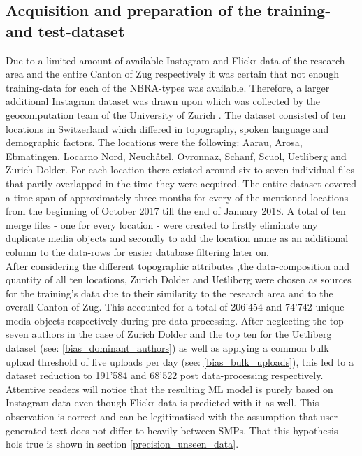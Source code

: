 \subsection{Acquisition and preparation of the training- and test-dataset} \label{preparation_training_data}
Due to a limited amount of available Instagram and Flickr data of the research area and the entire Canton of Zug respectively it was certain that not enough training-data for each of the NBRA-types was available. Therefore, a larger additional Instagram dataset was drawn upon which was collected by the geocomputation team of the University of Zurich \parencite{Gruzd2016}. The dataset consisted of ten locations in Switzerland which differed in topography, spoken language and demographic factors. The locations were the following: Aarau, Arosa, Ebmatingen, Locarno Nord, Neuch\^{a}tel, Ovronnaz, Schanf, Scuol, Uetliberg and Zurich Dolder. For each location there existed around six to seven individual files that partly overlapped in the time they were acquired. The entire dataset covered a time-span of approximately three months for every of the mentioned locations from the beginning of October 2017 till the end of January 2018. A total of ten merge files - one for every location - were created to firstly eliminate any duplicate media objects and secondly to add the location name as an additional column to the data-rows for easier database filtering later on.\\
\newline
After considering the different topographic attributes ,the data-composition and quantity of all ten locations, Zurich Dolder and Uetliberg were chosen as sources for the training's data due to their similarity to the research area and to the overall Canton of Zug. This accounted for a total of 206'454 and 74'742 unique media objects respectively during pre data-processing. After neglecting the top seven authors in the case of Zurich Dolder and the top ten for the Uetliberg dataset (see: \ref{bias_dominant_authors}) as well as applying a common bulk upload threshold of five uploads per day (see: \ref{bias_bulk_uploads}), this led to a dataset reduction to 191'584 and 68'522 post data-processing respectively. Attentive readers will notice that the resulting ML model is purely based on Instagram data even though Flickr data is predicted with it as well. This observation is correct and can be legitimatised with the assumption that user generated text does not differ to heavily between SMPs. That this hypothesis hols true is shown in section \ref{precision_unseen_data}.\\
